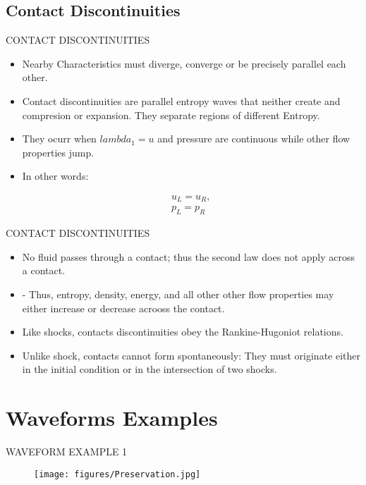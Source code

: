 \documentclass{beamer}
\begin{document}
\subsection{Contact Discontinuities}

\begin{frame}{CONTACT DISCONTINUITIES}
  \begin{itemize}
   \item Nearby Characteristics must diverge, converge or be precisely parallel each other. 
    \item Contact discontinuities are parallel entropy waves that neither create and compresion or expansion. They separate regions of different Entropy.
    \item They ocurr when $lambda_1=u$ and pressure are continuous while other flow properties jump. 
    \item In other words:
  \end{itemize}
  \begin{eqnarray}
    &&u_L=u_R,\\ 
    &&p_L=p_R
  \end{eqnarray}
\end{frame}

\begin{frame}{CONTACT DISCONTINUITIES}
  \begin{itemize}
   \item No fluid passes through a contact; thus the second law does not apply across a contact.
    \item  - Thus, entropy, density, energy, and all other other flow properties may either increase or decrease acrooss the contact.
    \item Like shocks, contacts discontinuities obey the Rankine-Hugoniot relations. 
    \item Unlike shock, contacts cannot form spontaneously: They must originate either in the initial condition or in the intersection of two shocks.
  \end{itemize}
\end{frame}

\section*{Waveforms Examples}

\begin{frame}{WAVEFORM EXAMPLE 1}
  \begin{figure}
   \texttt{[image: figures/Preservation.jpg]}
  \end{figure}
\end{frame}
\end{document}
